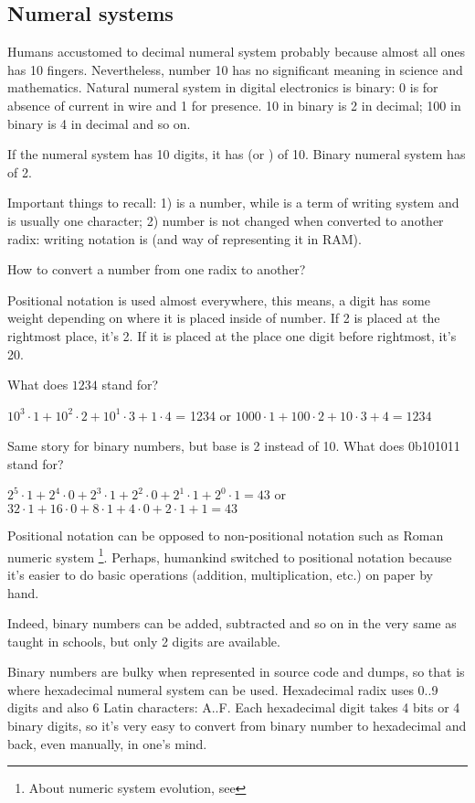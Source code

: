 \subsection{Numeral systems}

Humans accustomed to decimal numeral system probably because almost all ones has 10 fingers.
Nevertheless, number 10 has no significant meaning in science and mathematics.
Natural numeral system in digital electronics is binary: 0 is for absence of current in wire and 1 for presence.
10 in binary is 2 in decimal; 100 in binary is 4 in decimal and so on.

If the numeral system has 10 digits, it has  (or ) of 10.
Binary numeral system has  of 2.

Important things to recall:
1)  is a number, while  is a term of writing system and is usually one character;
2) number is not changed when converted to another radix: writing notation is (and way of representing it in \ac{RAM}).

How to convert a number from one radix to another?

Positional notation is used almost everywhere, this means, a digit has some weight depending on where it is placed inside of number.
If 2 is placed at the rightmost place, it's 2.
If it is placed at the place one digit before rightmost, it's 20.

What does $1234$ stand for?

$10^3 \cdot 1 + 10^2 \cdot 2 + 10^1 \cdot 3 + 1 \cdot 4$ = 1234 or
$1000 \cdot 1 + 100 \cdot 2 + 10 \cdot 3 + 4 = 1234$

Same story for binary numbers, but base is 2 instead of 10.
What does 0b101011 stand for?

$2^5 \cdot 1 + 2^4 \cdot 0 + 2^3 \cdot 1 + 2^2 \cdot 0 + 2^1 \cdot 1 + 2^0 \cdot 1 = 43$ or
$32 \cdot 1 + 16 \cdot 0 + 8 \cdot 1 + 4 \cdot 0 + 2 \cdot 1 + 1 = 43$

Positional notation can be opposed to non-positional notation such as Roman numeric system
\footnote{About numeric system evolution, see }.
Perhaps, humankind switched to positional notation because it's easier to do basic operations (addition, multiplication, etc.) on paper by hand.

Indeed, binary numbers can be added, subtracted and so on in the very same as taught in schools, but only 2 digits are available.

Binary numbers are bulky when represented in source code and dumps, so that is where hexadecimal numeral system can be used.
Hexadecimal radix uses 0..9 digits and also 6 Latin characters: A..F.
Each hexadecimal digit takes 4 bits or 4 binary digits, so it's very easy to convert from binary number to hexadecimal and back, even manually, in one's mind.

